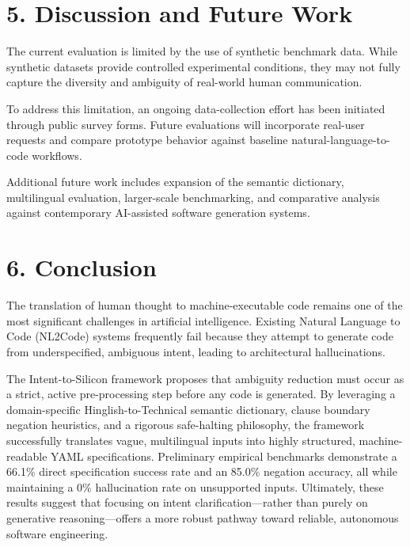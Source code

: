 \documentclass[11pt,a4paper]{article}
\begin{document}
\section{5. Discussion and Future Work}

The current evaluation is limited by the use of synthetic benchmark data. While synthetic datasets provide controlled experimental conditions, they may not fully capture the diversity and ambiguity of real-world human communication.

To address this limitation, an ongoing data-collection effort has been initiated through public survey forms. Future evaluations will incorporate real-user requests and compare prototype behavior against baseline natural-language-to-code workflows.

Additional future work includes expansion of the semantic dictionary, multilingual evaluation, larger-scale benchmarking, and comparative analysis against contemporary AI-assisted software generation systems.



\section{6. Conclusion}

The translation of human thought to machine-executable code remains one of the most significant challenges in artificial intelligence. Existing Natural Language to Code (NL2Code) systems frequently fail because they attempt to generate code from underspecified, ambiguous intent, leading to architectural hallucinations. 

The Intent-to-Silicon framework proposes that ambiguity reduction must occur as a strict, active pre-processing step before any code is generated. By leveraging a domain-specific Hinglish-to-Technical semantic dictionary, clause boundary negation heuristics, and a rigorous safe-halting philosophy, the framework successfully translates vague, multilingual inputs into highly structured, machine-readable YAML specifications. Preliminary empirical benchmarks demonstrate a 66.1\% direct specification success rate and an 85.0\% negation accuracy, all while maintaining a 0\% hallucination rate on unsupported inputs. Ultimately, these results suggest that focusing on intent clarification—rather than purely on generative reasoning—offers a more robust pathway toward reliable, autonomous software engineering.
\end{document}
